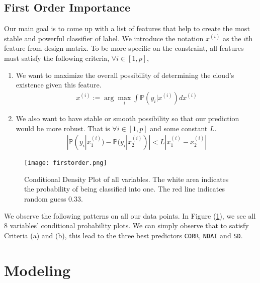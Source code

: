 \documentclass[letterpaper,11pt]{article}
\begin{document}
\subsection{First Order Importance}
Our main goal is to come up with a list of features that help to create the most stable and powerful classifier of label. We introduce the notation $x^{(i)}$ as the $i$th feature from design matrix. To be more specific on the constraint, all features must satisfy the following criteria, $\forall i\in[1,p]$,
\begin{enumerate}
  \item We want to maximize the overall possibility of determining the cloud's existence given this feature.
\begin{align*}
x^{(i)} := \arg\max_{i} \int \mathbb{P}(y_i|x^{(i)}) dx^{(i)}
\end{align*}
  \item We also want to have stable or smooth possibility so that our prediction would be more robust. That is $\forall i\in[1,p]$ and some constant $L$.
\begin{align*}
|\mathbb{P}(y_i|x^{(i)}_1) - \mathbb{P}(y_i|x^{(i)}_2)| < L |x^{(i)}_1 - x^{(i)}_2|
\end{align*}
\end{enumerate}

\begin{figure}
    \centering
    \texttt{[image: firstorder.png]}
    \caption{Conditional Density Plot of all variables. The white area indicates the probability of being classified into one. The red line indicates random guess 0.33.}
    \label{fig:firstorder}
\end{figure}

We observe the following patterns on all our data points. In Figure (\ref{fig:firstorder}), we see all 8 variables' conditional probability plots. We can simply observe that to satisfy Criteria (a) and (b), this lead to the three best predictors \verb|CORR|, \verb|NDAI| and \verb|SD|.

\section{Modeling}
\end{document}
